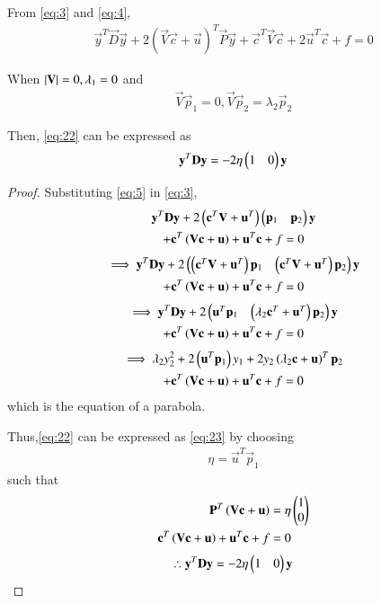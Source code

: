 \documentclass[journal,12pt,twocolumn]{IEEEtran}
\begin{document}
From \eqref{eq:3} and \eqref{eq:4},
\begin{align}
    \vec{y}^T\vec{D}\vec{y} + 2(\vec{V}\vec{c} + \vec{u})^T \vec{P}\vec{y} + \vec{c}^T\vec{V}\vec{c} + 2\vec{u}^T\vec{c} + f = 0
\end{align}
\begin{theorem}
When $\left\vert\mathbf{V}\right\vert = 0, \lambda_1 = 0$ and 
\begin{align}
\vec{V}\vec{p}_1 = 0, 
\vec{V}\vec{p}_2 = \lambda_2\vec{p}_2
\end{align}

Then, \eqref{eq:22} can be expressed as 
\begin{align}
\mathbf{y}^T\mathbf{D}\mathbf{y} = -2\eta\begin{pmatrix}1 & 0\end{pmatrix}\mathbf{y} \label{eq:23}
\end{align}
\end{theorem}
\begin{proof}
Substituting \eqref{eq:5} in \eqref{eq:3},
\begin{multline}
\mathbf{y}^T\mathbf{D}\mathbf{y}+2\left(\mathbf{c}^T\mathbf{V}+\mathbf{u}^T\right)\begin{pmatrix}\mathbf{p}_1 & \mathbf{p}_2\end{pmatrix}\mathbf{y}
\\
+  \mathbf{c}^T\left(\mathbf{V}\mathbf{c} + \mathbf{u}\right)+ \mathbf{u}^T\mathbf{c} + f= 0
\end{multline}
\begin{multline}
\implies
\mathbf{y}^T\mathbf{D}\mathbf{y}+2\begin{pmatrix}\left(\mathbf{c}^T\mathbf{V}+\mathbf{u}^T\right)\mathbf{p}_1 & \left(\mathbf{c}^T\mathbf{V}+\mathbf{u}^T\right)\mathbf{p}_2\end{pmatrix}\mathbf{y}
\\
+  \mathbf{c}^T\left(\mathbf{V}\mathbf{c} + \mathbf{u}\right)+ \mathbf{u}^T\mathbf{c} + f= 0
\end{multline}
\begin{multline}
\implies \mathbf{y}^T\mathbf{D}\mathbf{y}+2\begin{pmatrix}\mathbf{u}^T\mathbf{p}_1 & \left(\lambda_2\mathbf{c}^T+\mathbf{u}^T\right)\mathbf{p}_2\end{pmatrix}\mathbf{y}
\\
+  \mathbf{c}^T\left(\mathbf{V}\mathbf{c} + \mathbf{u}\right)+ \mathbf{u}^T\mathbf{c} + f= 0
\end{multline}
\begin{multline}
\implies \lambda_2y_2^2+2\left(\mathbf{u}^T\mathbf{p}_1\right)y_1+  2y_2\left(\lambda_2\mathbf{c}+\mathbf{u}\right)^T\mathbf{p}_2
\\
+  \mathbf{c}^T\left(\mathbf{V}\mathbf{c} + \mathbf{u}\right)+ \mathbf{u}^T\mathbf{c} + f= 0\label{eq:6}
\end{multline}
which is the equation of a parabola.

Thus,\eqref{eq:22} can be expressed as \eqref{eq:23} by choosing
\begin{align}
\eta = \vec{u}^T\vec{p}_1
\end{align}
such that
\begin{align}
\label{eq:7}
\mathbf{P}^{T}\left(\mathbf{V}\mathbf{c}+\mathbf{u}\right) &= \eta\begin{pmatrix}1\\0\end{pmatrix}
\\
\mathbf{c}^T\left(\mathbf{V}\mathbf{c} + \mathbf{u}\right)+ \mathbf{u}^T\mathbf{c} + f&= 0
\label{eq:8}
\end{align}
\begin{align}
\therefore 
\mathbf{y}^T\mathbf{D}\mathbf{y} = -2\eta\begin{pmatrix}1 & 0\end{pmatrix}\mathbf{y} \label{eq:11}
\end{align}
\end{proof}
\end{document}
